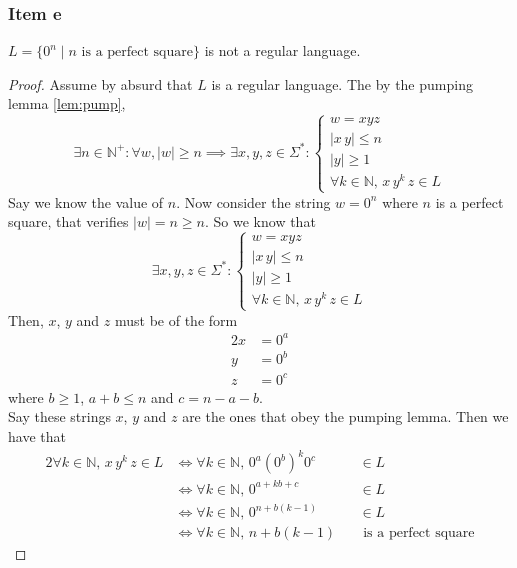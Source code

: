 \documentclass[docid=TP07]{tcom_TP}
\begin{document}
{\subsubsection{Item e}
\begin{theorem}
$L=\{0^n\mid n \text{ is a perfect square}\}$ is not a regular language.
\end{theorem}
\begin{proof}
Assume  by absurd that $L$ is a regular language. The by the pumping lemma \eqref{lem:pump},
\begin{equation*}
	\exists n \in \mathbb{N}^+ \colon \forall w, |w|\geq n \implies \exists x, y, z \in \Sigma^* \colon 
	\begin{cases}
		w = xyz \\
		|x\,y| \leq n\\
		|y| \geq 1\\
		\forall k \in \mathbb{N},\,x\,y^k\,z \in L
\end{cases}
\end{equation*}
Say we know the value of $n$. Now consider the string $w=0^n$ where $n$ is a perfect square, that verifies $|w|=n \geq n$. So we know that
\begin{equation*}
\exists x, y, z \in \Sigma^* \colon 
\begin{cases}
	w = xyz \\
	|x\,y| \leq n\\
	|y| \geq 1\\
	\forall k \in \mathbb{N},\,x\,y^k\,z \in L
\end{cases}
\end{equation*}
Then, $x$, $y$ and $z$ must be of the form
\begin{alignat*}{2}
	x &= 0^a\\
	y &= 0^b\\
	z &= 0^c
\end{alignat*}
where $b \geq 1$, $a+b \leq n$ and $c=n-a-b$.\\
Say these strings $x$, $y$ and $z$ are the ones that obey the pumping lemma. Then we have that
\begin{alignat*}{2}
	\forall k \in \mathbb{N},\,x\,y^k\,z \in L
	& \iff \forall k \in \mathbb{N},\,0^a(0^b)^k0^c && \in L \\
	& \iff \forall k \in \mathbb{N},\,0^{a+kb+c}    && \in L \\
	& \iff \forall k \in \mathbb{N},\,0^{n+b(k-1)}  && \in L \\
	& \iff \forall k \in \mathbb{N},\,n+b(k-1)      && \text{ is a perfect square}
\end{alignat*}

\end{proof}}
\end{document}
